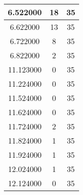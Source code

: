 \begin{longtable}[htbp]{|c|c|c|}
6.522000 & 18 & 35 \\ \hline
6.622000 & 13 & 35 \\ \hline
6.722000 & 8 & 35 \\ \hline
6.822000 & 2 & 35 \\ \hline
11.123000 & 0 & 35 \\ \hline
11.224000 & 0 & 35 \\ \hline
11.524000 & 0 & 35 \\ \hline
11.624000 & 0 & 35 \\ \hline
11.724000 & 2 & 35 \\ \hline
11.824000 & 1 & 35 \\ \hline
11.924000 & 1 & 35 \\ \hline
12.024000 & 1 & 35 \\ \hline
12.124000 & 0 & 35 \\ \hline
\end{longtable}
